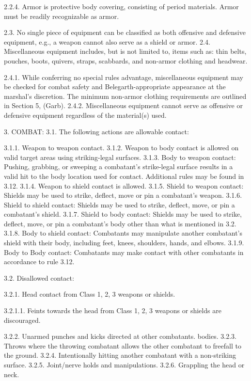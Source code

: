 \documentclass[12pt]{article}
\begin{document}
\begin{level}[start=0]
2.2.4. Armor is protective body covering, consisting of period materials. Armor must be readily recognizable as armor.

2.3. No single piece of equipment can be classified as both offensive and defensive equipment, e.g., a weapon cannot also serve as a shield or armor.
2.4. Miscellaneous equipment includes, but is not limited to, items such as: thin belts, pouches, boots, quivers, straps, scabbards, and non-armor clothing and headwear.

2.4.1. While conferring no special rules advantage, miscellaneous equipment may be checked for combat safety and Belegarth-appropriate appearance at the marshal’s discretion. The minimum non-armor clothing requirements are outlined in Section 5, (Garb).
2.4.2. Miscellaneous equipment cannot serve as offensive or defensive equipment regardless of the material(s) used.

3. COMBAT:
3.1. The following actions are allowable contact:

3.1.1. Weapon to weapon contact.
3.1.2. Weapon to body contact is allowed on valid target areas using striking-legal surfaces.
3.1.3. Body to weapon contact: Pushing, grabbing, or sweeping a combatant’s strike-legal surface results in a valid hit to the body location used for contact. Additional rules may be found in 3.12.
3.1.4. Weapon to shield contact is allowed.
3.1.5. Shield to weapon contact: Shields may be used to strike, deflect, move or pin a combatant’s weapon.
3.1.6. Shield to shield contact: Shields may be used to strike, deflect, move, or pin a combatant’s shield.
3.1.7. Shield to body contact: Shields may be used to strike, deflect, move, or pin a combatant’s body other than what is mentioned in 3.2.
3.1.8. Body to shield contact: Combatants may manipulate another combatant’s shield with their body, including feet, knees, shoulders, hands, and elbows.
3.1.9. Body to Body contact: Combatants may make contact with other combatants in accordance to rule 3.12.

3.2. Disallowed contact:

3.2.1. Head contact from Class 1, 2, 3 weapons or shields.

3.2.1.1. Feints towards the head from Class 1, 2, 3 weapons or shields are discouraged.

3.2.2. Unarmed punches and kicks directed at other combatants. bodies.
3.2.3. Throws where the throwing combatant allows the other combatant to freefall to the ground.
3.2.4. Intentionally hitting another combatant with a non-striking surface.
3.2.5. Joint/nerve holds and manipulations.
3.2.6. Grappling the head or neck.


\end{level}
\end{document}
